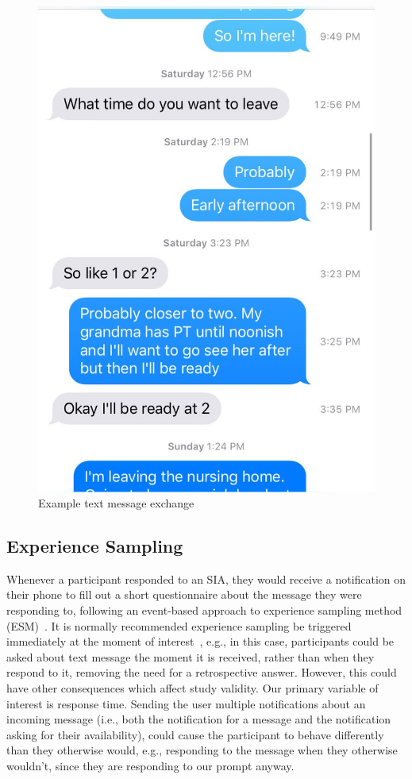 \documentclass[12pt]{nuthesis}	%
\begin{document}
\begin{figure}[h]
\centering
\includegraphics[width=.7\textwidth]{figures/example_sia}
\caption{Example text message exchange}
\label{fig:sia}
\end{figure}


\subsection{Experience Sampling}

Whenever a participant responded to an SIA, they would receive a notification on their phone to fill out a short questionnaire about the message they were responding to, following an event-based approach to experience sampling method (ESM)~\citep{conner2009experience,csikszentmihalyi2014validity}. It is normally recommended experience sampling  be triggered immediately at the moment of interest~\citep{hormuth1986sampling}, e.g., in this case, participants could be asked about text message the moment it is received, rather than when they respond to it, removing the need for a retrospective answer. However, this could have other consequences which affect study validity. Our primary variable of interest is response time. Sending the user multiple notifications about an incoming message (i.e., both the notification for a message and the notification asking for their availability), could cause the participant to behave differently than they otherwise would, e.g., responding to the message when they otherwise wouldn't, since they are responding to our prompt anyway.
\end{document}
